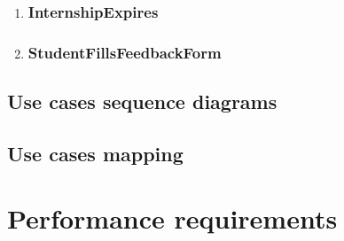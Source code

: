 \begin{enumerate}[label=\textbf{UC\arabic* -}]
\begin{figure}[H]
    \centering
\end{figure}

\item \subsubsection{InternshipExpires}

\item \subsubsection{StudentFillsFeedbackForm}

\end{enumerate}

\subsection{Use cases sequence diagrams}

\subsection{Use cases mapping}

\section{Performance requirements}

